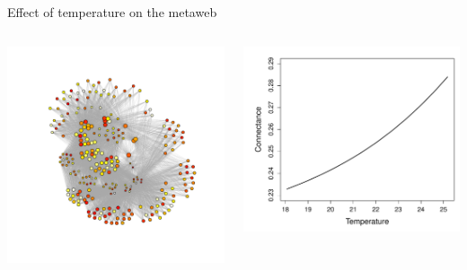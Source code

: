 \documentclass{eecslides}
\begin{document}
	\begin{frame}{Effect of temperature on the metaweb}
 	    	\begin{columns}
			\begin{column}{0.4\textwidth}							
					\includegraphics[height=0.6\textheight]{graph_mw}\\	
			\end{column}
			\begin{column}{0.6\textwidth}
				\begin{center}
					\includegraphics[height=0.5\textheight]{ConnectanceTemp}\\	
				\end{center}
			\end{column}				
		\end{columns}	   
	\end{frame}
\end{document}
